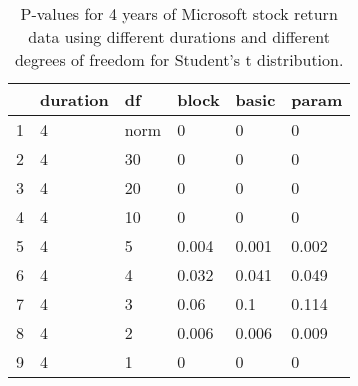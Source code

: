 \begin{table}[ht]
\centering
\caption{P-values for 4 years of Microsoft stock return 
                   data using different durations
  and different degrees of freedom for Student's t distribution.} 
\label{table:microsoft4}
\begin{tabular}{rlllll}
  \hline
 & duration & df & block & basic & param \\ 
  \hline
1 & 4 & norm & 0 & 0 & 0 \\ 
  2 & 4 & 30 & 0 & 0 & 0 \\ 
  3 & 4 & 20 & 0 & 0 & 0 \\ 
  4 & 4 & 10 & 0 & 0 & 0 \\ 
  5 & 4 & 5 & 0.004 & 0.001 & 0.002 \\ 
  6 & 4 & 4 & 0.032 & 0.041 & 0.049 \\ 
  7 & 4 & 3 & 0.06 & 0.1 & 0.114 \\ 
  8 & 4 & 2 & 0.006 & 0.006 & 0.009 \\ 
  9 & 4 & 1 & 0 & 0 & 0 \\ 
   \hline
\end{tabular}
\end{table}

